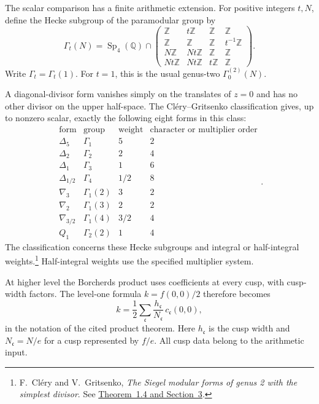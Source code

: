 The scalar comparison has a finite arithmetic extension.
For positive integers \(t,N\), define the Hecke subgroup
of the paramodular group by
\[
 \Gamma_t(N)=\operatorname{Sp}_4(\mathbb Q)\cap
 \begin{pmatrix}
 \mathbb Z&t\mathbb Z&\mathbb Z&\mathbb Z\\
 \mathbb Z&\mathbb Z&\mathbb Z&t^{-1}\mathbb Z\\
 N\mathbb Z&Nt\mathbb Z&\mathbb Z&\mathbb Z\\
 Nt\mathbb Z&Nt\mathbb Z&t\mathbb Z&\mathbb Z
 \end{pmatrix}.
\]
Write \(\Gamma_t=\Gamma_t(1)\).
For \(t=1\), this is the usual genus-two
\(\Gamma_0^{(2)}(N)\).

A diagonal-divisor form vanishes simply on the translates
of \(z=0\) and has no other divisor on the upper half-space.
The Cl\'ery--Gritsenko classification gives, up to nonzero
scalar, exactly the following eight forms in this class:
\[
 \begin{array}{c|c|c|c}
 \text{form}&\text{group}&\text{weight}&
          \text{character or multiplier order}\\ \hline
 \Delta_5&\Gamma_1&5&2\\
 \Delta_2&\Gamma_2&2&4\\
 \Delta_1&\Gamma_3&1&6\\
 \Delta_{1/2}&\Gamma_4&1/2&8\\
 \nabla_3&\Gamma_1(2)&3&2\\
 \nabla_2&\Gamma_1(3)&2&2\\
 \nabla_{3/2}&\Gamma_1(4)&3/2&4\\
 Q_1&\Gamma_2(2)&1&4
 \end{array}.
\]
The classification concerns these Hecke subgroups and
integral or half-integral weights.\footnote{
F.~Cl\'ery and V.~Gritsenko,
\emph{The Siegel modular forms of genus 2 with the simplest divisor}.
See \href{https://arxiv.org/abs/0812.3962}
{Theorem~1.4 and Section~3}.}
Half-integral weights use the specified multiplier system.

At higher level the Borcherds product uses coefficients
at every cusp, with cusp-width factors.
The level-one formula \(k=f(0,0)/2\) therefore becomes
\[
 k=\frac12\sum_{\mathfrak c}
             \frac{h_{\mathfrak c}}{N_{\mathfrak c}}\,
                         c_{\mathfrak c}(0,0),
\]
in the notation of the cited product theorem.
Here \(h_{\mathfrak c}\) is the cusp width and
\(N_{\mathfrak c}=N/e\) for a cusp represented by \(f/e\).
All cusp data belong to the arithmetic input.


